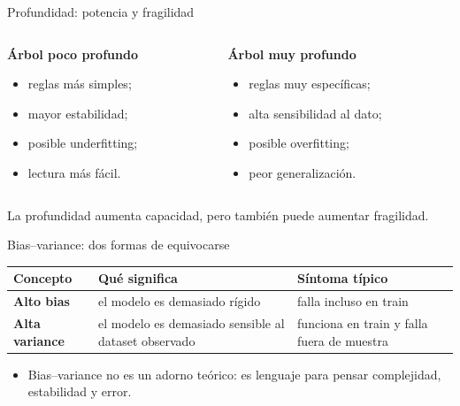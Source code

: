\documentclass[aspectratio=169,12pt]{beamer}
\newcommand{\colhead}[1]{\textbf{#1}\par\vspace{2pt}}
\newcommand{\hrow}{\rowcolor{mlcream}}
\begin{document}
\begin{frame}{Profundidad: potencia y fragilidad}
  \large
  \begin{columns}[T]
    \begin{column}{0.45\textwidth}
      \colhead{Árbol poco profundo}
      \begin{itemize}
        \item reglas más simples;
        \item mayor estabilidad;
        \item posible underfitting;
        \item lectura más fácil.
      \end{itemize}
    \end{column}
    \begin{column}{0.45\textwidth}
      \colhead{Árbol muy profundo}
      \begin{itemize}
        \item reglas muy específicas;
        \item alta sensibilidad al dato;
        \item posible overfitting;
        \item peor generalización.
      \end{itemize}
    \end{column}
  \end{columns}
  \vspace{8pt}
  \begin{center}
    La profundidad aumenta capacidad, pero también puede aumentar fragilidad.
  \end{center}
\end{frame}

\begin{frame}{Bias--variance: dos formas de equivocarse}
  \centering
  \begin{tabular}{@{}l L{0.3\textwidth} L{0.3\textwidth}@{}}
    \toprule
    \hrow \textbf{Concepto} & Qué significa & Síntoma típico \\
    \midrule
    \textbf{Alto bias} & el modelo es demasiado rígido & falla incluso en train \\
    \textbf{Alta variance} & el modelo es demasiado sensible al dataset observado & funciona en train y falla fuera de muestra \\
    \bottomrule
  \end{tabular}
  \vspace{10pt}
  \raggedright\large
  \begin{itemize}
    \item Bias--variance no es un adorno teórico: es lenguaje para pensar complejidad, estabilidad y error.
  \end{itemize}
\end{frame}
\end{document}
